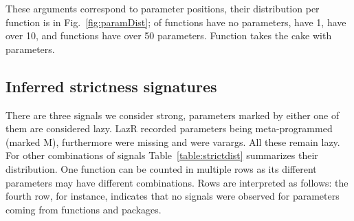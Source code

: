 \documentclass[review,creen,acmsmall]{acmart}
\newcommand{\lazr}{{\sf LazR}\xspace}
\begin{document}
These arguments correspond to \TotalParameterCount parameter positions, their
distribution per function is in Fig.~\ref{fig:paramDist}; \ZeroArityFunctionPerc
of functions have no parameters, \OneArityFunctionPerc have 1,
\TenArityFunctionPerc have over 10, and \FiftyArityFunctionCount functions have
over 50 parameters. Function \texttt{\MaxArityFunctionName} takes the cake with
\texttt{\MaxArityFunctionParamCount} parameters.

\subsection{Inferred strictness signatures}\label{sec:results}

There are three signals we consider strong, parameters marked by either one of
them are considered lazy. \lazr recorded \MetaCountParametersTotal parameters
being meta-programmed (marked M), furthermore \MissingAlwaysCountParameters were
missing and \VarargParameterCount were varargs. All these remain lazy. For other
combinations of signals Table~\ref{table:strictdist} summarizes their
distribution. One function can be counted in multiple rows as its different
parameters may have different combinations. Rows are interpreted as follows: the
fourth row, for instance, indicates that no signals were observed for
\TotalStrictParamCount parameters coming from \TotalStrictFunCount functions and
\TotalStrictPackCount packages.
\end{document}
